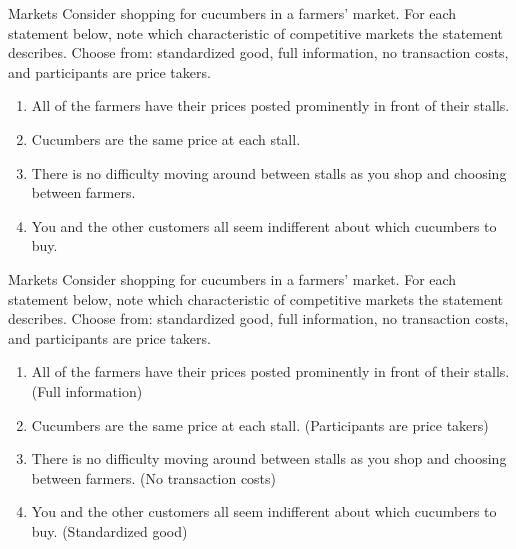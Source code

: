 \documentclass{beamer}
\begin{document}
\begin{frame}[t]{Markets}
    Consider shopping for cucumbers in a farmers’ market. For each statement below, note which characteristic of competitive markets the statement describes. Choose from: standardized good, full information, no transaction costs, and participants are price takers.
    \begin{enumerate}
        \item All of the farmers have their prices posted prominently in front of their stalls. 
        \item Cucumbers are the same price at each stall.
        \item There is no difficulty moving around between stalls as you shop and choosing between farmers.
        \item You and the other customers all seem indifferent about which cucumbers to buy.
    \end{enumerate}
\end{frame}

\begin{frame}[t]{Markets}
    Consider shopping for cucumbers in a farmers’ market. For each statement below, note which characteristic of competitive markets the statement describes. Choose from: standardized good, full information, no transaction costs, and participants are price takers.
    \begin{enumerate}
        \item All of the farmers have their prices posted prominently in front of their stalls. (Full information)
        \item Cucumbers are the same price at each stall. (Participants are price takers)
        \item There is no difficulty moving around between stalls as you shop and choosing between farmers. (No transaction costs)
        \item You and the other customers all seem indifferent about which cucumbers to buy. (Standardized good)
    \end{enumerate}
\end{frame}
\end{document}
